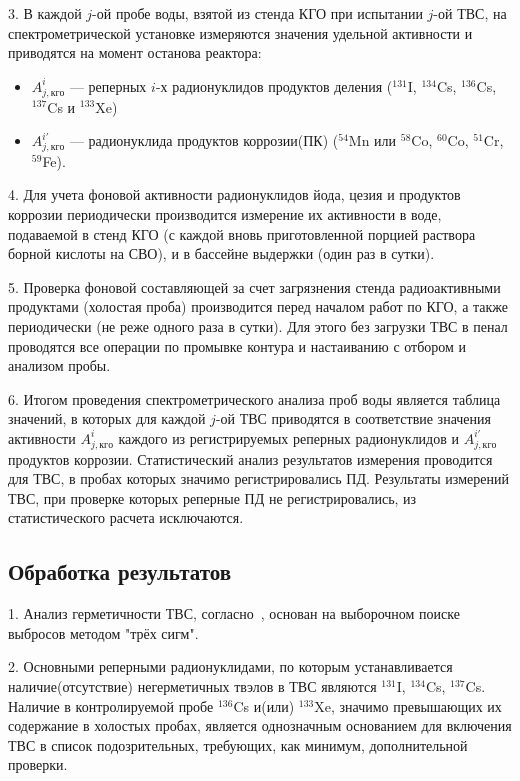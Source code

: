 3. В каждой $j$-ой пробе воды, взятой из стенда КГО при испытании $j$-ой ТВС, на спектрометрической установке измеряются значения удельной активности и приводятся на момент останова реактора:
\begin{itemize}
\item $A_{j,кго}^{i}$ --- реперных $i$-х радионуклидов продуктов деления ($^{131}$I, $^{134}$Cs, $^{136}$Cs, $^{137}$Cs и $^{133}$Xe)

\item $A_{j,кго}^{i'}$ --- радионуклида продуктов коррозии(ПК) ($^{54}$Mn или $^{58}$Co, $^{60}$Co, $^{51}$Cr, $^{59}$Fe).
\end{itemize}

4. Для учета фоновой активности радионуклидов йода, цезия и
продуктов коррозии периодически производится измерение их активности
в воде, подаваемой в стенд КГО (с каждой вновь приготовленной порцией
раствора борной кислоты на СВО), и в бассейне выдержки (один раз в
сутки).

5. Проверка фоновой составляющей за счет загрязнения стенда
радиоактивными продуктами (холостая проба) производится перед началом
работ по КГО, а также периодически (не реже одного раза в сутки). Для этого
без загрузки ТВС в пенал проводятся все операции по промывке контура и
настаиванию с отбором и анализом пробы.

6. Итогом проведения спектрометрического анализа проб воды является
таблица значений, в которых для каждой $j$-ой ТВС приводятся в соответствие
значения активности $A_{j,кго}^{i}$ каждого из регистрируемых реперных радионуклидов
и $A_{j,кго}^{i'}$ продуктов коррозии. Статистический анализ результатов
измерения проводится для ТВС, в пробах которых значимо регистрировались
ПД. Результаты измерений ТВС, при проверке которых реперные ПД не
регистрировались, из статистического расчета исключаются.

\subsection{Обработка результатов}
1. Анализ герметичности ТВС, согласно~\cite{RD}, основан на выборочном поиске выбросов методом "трёх сигм".

2. Основными реперными радионуклидами, по которым устанавливается наличие(отсутствие) негерметичных твэлов в ТВС являются $^{131}$I, $^{134}$Cs, $^{137}$Cs. Наличие в контролируемой пробе $^{136}$Cs и(или) $^{133}$Xe, значимо превышающих их содержание в холостых пробах, является однозначным основанием для включения ТВС в список подозрительных, требующих, как минимум, дополнительной проверки.

